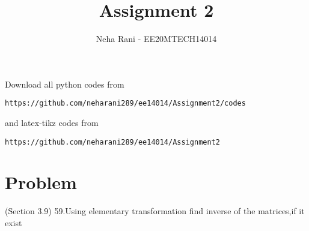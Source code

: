 \documentclass[journal,12pt,twocolumn]{IEEEtran}
\begin{document}
     \def\rightbox#1{\makebox[0in][r]{#1}}
     \def\centbox#1{\makebox[0in]{#1}}
     \def\topbox#1{\raisebox{-\baselineskip}[0in][0in]{#1}}
     \def\midbox#1{\raisebox{-0.5\baselineskip}[0in][0in]{#1}}
\vspace{3cm}
\title{Assignment 2}
\author{Neha Rani - EE20MTECH14014}
\maketitle
\newpage
\bigskip
\renewcommand{\thefigure}{\theenumi}
\renewcommand{\thetable}{\theenumi}
Download all python codes from 
\begin{lstlisting}
https://github.com/neharani289/ee14014/Assignment2/codes
\end{lstlisting}
%
and latex-tikz codes from 
%
\begin{lstlisting}
https://github.com/neharani289/ee14014/Assignment2
\end{lstlisting}
\section{\textbf{Problem}}
(Section 3.9) 59.Using elementary transformation find inverse of the matrices,if it exist
\end{document}

